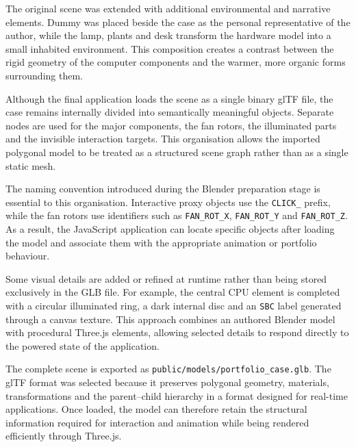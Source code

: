 \documentclass{report}
\begin{document}
The original scene was extended with additional environmental and
narrative elements. Dummy was placed beside the case as the personal
representative of the author, while the lamp, plants and desk transform
the hardware model into a small inhabited environment. This composition
creates a contrast between the rigid geometry of the computer components
and the warmer, more organic forms surrounding them.

Although the final application loads the scene as a single binary glTF
file, the case remains internally divided into semantically meaningful
objects. Separate nodes are used for the major components, the fan
rotors, the illuminated parts and the invisible interaction targets.
This organisation allows the imported polygonal model to be treated as
a structured scene graph rather than as a single static mesh.

The naming convention introduced during the Blender preparation stage
is essential to this organisation. Interactive proxy objects use the
\texttt{CLICK\_} prefix, while the fan rotors use identifiers such as
\texttt{FAN\_ROT\_X}, \texttt{FAN\_ROT\_Y} and
\texttt{FAN\_ROT\_Z}. As a result, the JavaScript application can locate
specific objects after loading the model and associate them with the
appropriate animation or portfolio behaviour.

Some visual details are added or refined at runtime rather than being
stored exclusively in the GLB file. For example, the central CPU element
is completed with a circular illuminated ring, a dark internal disc and
an \texttt{SBC} label generated through a canvas texture. This approach
combines an authored Blender model with procedural Three.js elements,
allowing selected details to respond directly to the powered state of
the application.

The complete scene is exported as
\texttt{public/models/portfolio\_case.glb}. The glTF format was selected
because it preserves polygonal geometry, materials, transformations and
the parent--child hierarchy in a format designed for real-time
applications. Once loaded, the model can therefore retain the structural
information required for interaction and animation while being rendered
efficiently through Three.js.
\end{document}
